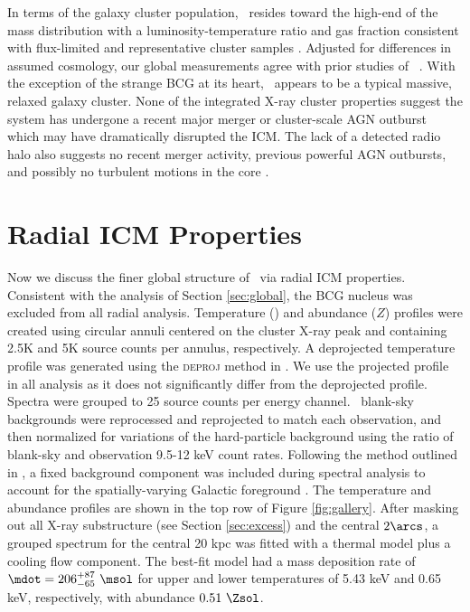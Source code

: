\documentclass[useAMS,usenatbib]{mn2e}
\begin{document}
In terms of the galaxy cluster population, \rxj\ resides toward the
high-end of the mass distribution with a luminosity-temperature ratio
and gas fraction consistent with flux-limited and representative
cluster samples \citep{hiflugcs2, 2009A&A...498..361P}. Adjusted for
differences in assumed cosmology, our global measurements agree with
prior studies of \irs\ \citep[\eg][]{2000MNRAS.315..269A}. With the
exception of the strange BCG at its heart, \rxj\ appears to be a
typical massive, relaxed galaxy cluster. None of the integrated X-ray
cluster properties suggest the system has undergone a recent major
merger or cluster-scale AGN outburst which may have dramatically
disrupted the ICM. The lack of a detected radio halo also suggests no
recent merger activity, previous powerful AGN outbursts, and possibly
no turbulent motions in the core \citep[\eg][]{2008SSRv..134...93F}.

\section{Radial ICM Properties}
\label{sec:rad}

Now we discuss the finer global structure of \rxj\ via radial ICM
properties. Consistent with the analysis of Section \ref{sec:global},
the BCG nucleus was excluded from all radial analysis. Temperature
(\tx) and abundance ($Z$) profiles were created using circular annuli
centered on the cluster X-ray peak and containing 2.5K and 5K source
counts per annulus, respectively. A deprojected temperature profile
was generated using the \textsc{deproj} method in \xspec. We use the
projected profile in all analysis as it does not significantly differ
from the deprojected profile. Spectra were grouped to 25 source counts
per energy channel. \caldb\ blank-sky backgrounds were reprocessed and
reprojected to match each observation, and then normalized for
variations of the hard-particle background using the ratio of
blank-sky and observation 9.5-12 keV count rates. Following the method
outlined in \citet{2005ApJ...628..655V}, a fixed background component
was included during spectral analysis to account for the
spatially-varying Galactic foreground \citep[see][for more
  detail]{xrayband}. The temperature and abundance profiles are shown
in the top row of Figure \ref{fig:gallery}. After masking out all
X-ray substructure (see Section \ref{sec:excess}) and the central
$2\arcs$, a grouped spectrum for the central 20 kpc was fitted with a
thermal model plus a cooling flow component. The best-fit model had a
mass deposition rate of $\mdot = 206^{+87}_{-65} ~\msol$ for upper and
lower temperatures of 5.43 keV and 0.65 keV, respectively, with
abundance $0.51 ~\Zsol$.
\end{document}
